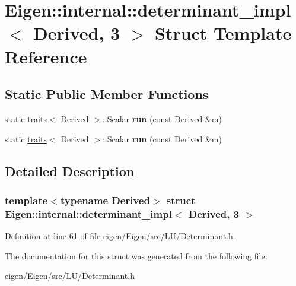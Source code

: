 \hypertarget{struct_eigen_1_1internal_1_1determinant__impl_3_01_derived_00_013_01_4}{}\section{Eigen\+:\+:internal\+:\+:determinant\+\_\+impl$<$ Derived, 3 $>$ Struct Template Reference}
\label{struct_eigen_1_1internal_1_1determinant__impl_3_01_derived_00_013_01_4}
\subsection*{Static Public Member Functions}
\begin{DoxyCompactItemize}
\item 
\mbox{\label{struct_eigen_1_1internal_1_1determinant__impl_3_01_derived_00_013_01_4_ac268a58e38b0278820e9e5f470740cd7}} 
static \hyperlink{struct_eigen_1_1internal_1_1traits}{traits}$<$ Derived $>$\+::Scalar {\bfseries run} (const Derived \&m)
\item 
\mbox{\label{struct_eigen_1_1internal_1_1determinant__impl_3_01_derived_00_013_01_4_ac268a58e38b0278820e9e5f470740cd7}} 
static \hyperlink{struct_eigen_1_1internal_1_1traits}{traits}$<$ Derived $>$\+::Scalar {\bfseries run} (const Derived \&m)
\end{DoxyCompactItemize}


\subsection{Detailed Description}
\subsubsection*{template$<$typename Derived$>$\newline
struct Eigen\+::internal\+::determinant\+\_\+impl$<$ Derived, 3 $>$}



Definition at line \hyperlink{eigen_2_eigen_2src_2_l_u_2_determinant_8h_source_l00061}{61} of file \hyperlink{eigen_2_eigen_2src_2_l_u_2_determinant_8h_source}{eigen/\+Eigen/src/\+L\+U/\+Determinant.\+h}.



The documentation for this struct was generated from the following file\+:\begin{DoxyCompactItemize}
\item 
eigen/\+Eigen/src/\+L\+U/\+Determinant.\+h\end{DoxyCompactItemize}
